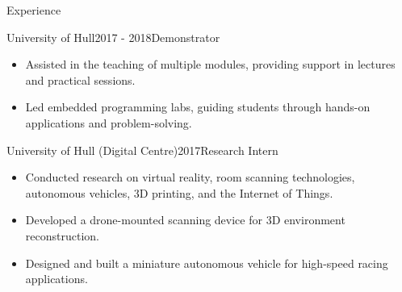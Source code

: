 \documentclass{cv}
\begin{document}
\begin{rSection}{Experience}
        \item \begin{rSubsection}{University of Hull}{2017 - 2018}{Demonstrator}{}
            \item \begin{itemize}
                \item Assisted in the teaching of multiple modules, providing support in lectures and practical sessions.
                \item Led embedded programming labs, guiding students through hands-on applications and problem-solving.
            \end{itemize}
        \end{rSubsection}
        
        \item \begin{rSubsection}{University of Hull (Digital Centre)}{2017}{Research Intern}{}
            \item \begin{itemize}
                \item Conducted research on virtual reality, room scanning technologies, autonomous vehicles, 3D printing, and the Internet of Things.
                \item Developed a drone-mounted scanning device for 3D environment reconstruction.
                \item Designed and built a miniature autonomous vehicle for high-speed racing applications.
            \end{itemize}
        \end{rSubsection}
    \end{rSection}
    
\end{document}
